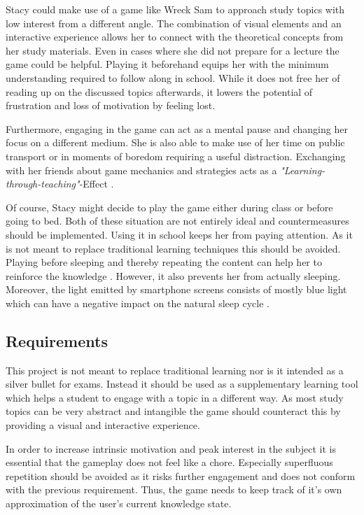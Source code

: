 Stacy could make use of a game like Wreck Sam to approach study topics with low interest from a different angle. The combination of visual elements and an interactive experience allows her to connect with the theoretical concepts from her study materials. Even in cases where she did not prepare for a lecture the game could be helpful. Playing it beforehand equips her with the minimum understanding required to follow along in school. While it does not free her of reading up on the discussed topics afterwards, it lowers the potential of frustration and loss of motivation by feeling lost.

Furthermore, engaging in the game can act as a mental pause and changing her focus on a different medium. She is also able to make use of her time on public transport or in moments of boredom requiring a useful distraction. Exchanging with her friends about game mechanics and strategies acts as a \textit{"Learning-through-teaching"}-Effect \cite{Webb2016Learning}.

Of course, Stacy might decide to play the game either during class or before going to bed. Both of these situation are not entirely ideal and countermeasures should be implemented.
Using it in school keeps her from paying attention. As it is not meant to replace traditional learning techniques this should be avoided.
Playing before sleeping and thereby repeating the content can help her to reinforce the knowledge \cite{Gais2006SleepRecall}. However, it also prevents her from actually sleeping. Moreover, the light emitted by smartphone screens consists of mostly blue light which can have a negative impact on the natural sleep cycle \cite{Tosini2016EffectsPhysiology.}.

\subsection{Requirements} \label{requirements}
This project is not meant to replace traditional learning nor is it intended as a silver bullet for exams.
Instead it should be used as a supplementary learning tool which helps a student to engage with a topic in a different way.
As most study topics can be very abstract and intangible the game should counteract this by providing a visual and interactive experience.

In order to increase intrinsic motivation and peak interest in the subject it is essential that the gameplay does not feel like a chore.
Especially superfluous repetition should be avoided as it risks further engagement and does not conform with the previous requirement.
Thus, the game needs to keep track of it's own approximation of the user's current knowledge state.

